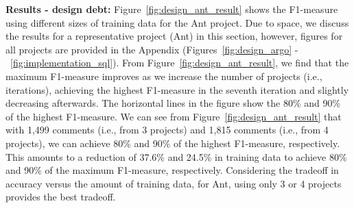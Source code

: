 
\noindent \textbf{Results - design debt:} Figure~\ref{fig:design_ant_result} shows the F1-measure using different sizes of training data for the Ant project. Due to space, we discuss the results for a representative project (Ant) in this section, however, figures for all projects are provided in the Appendix (Figures~\ref{fig:design_argo} -~\ref{fig:implementation_sql}). From Figure~\ref{fig:design_ant_result}, we find that the maximum F1-measure improves as we increase the number of projects (i.e., iterations), achieving the highest F1-measure in the seventh iteration and slightly decreasing afterwards. The horizontal lines in the figure show the 80\% and 90\% of the highest F1-measure. We can see from Figure~\ref{fig:design_ant_result} that with 1,499 comments (i.e., from 3 projects) and 1,815 comments (i.e., from 4 projects), we can achieve 80\% and 90\% of the highest F1-measure, respectively. This amounts to a reduction of  37.6\% and 24.5\% in training data to achieve 80\% and 90\% of the maximum F1-measure, respectively. Considering the tradeoff in accuracy versus the amount of training data, for Ant, using only 3 or 4 projects provides the best tradeoff.



